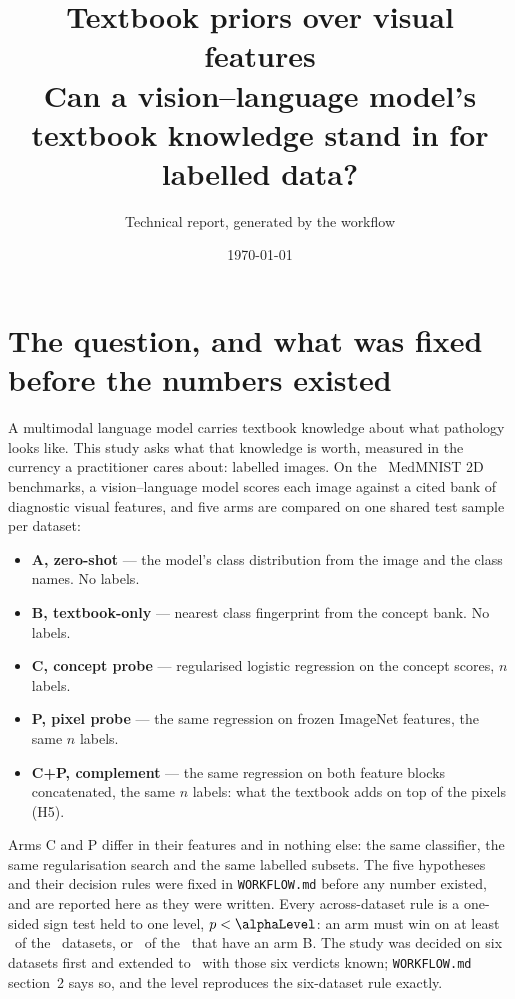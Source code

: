 \documentclass[11pt]{article}
\title{Textbook priors over visual features\\[2pt]
\large Can a vision--language model's textbook knowledge stand in for labelled data?}
\author{Technical report, generated by the workflow}
\date{\today}
\begin{document}
\maketitle

\tableofcontents
\clearpage

\section{The question, and what was fixed before the numbers existed}

A multimodal language model carries textbook knowledge about what pathology looks like. This study
asks what that knowledge is worth, measured in the currency a practitioner cares about: labelled
images. On the \numDatasets\ MedMNIST 2D benchmarks, a vision--language model scores each image
against a cited bank of diagnostic visual features, and five arms are compared on one shared test
sample per dataset:

\begin{itemize}
  \item \textbf{A, zero-shot} --- the model's class distribution from the image and the class names.
        No labels.
  \item \textbf{B, textbook-only} --- nearest class fingerprint from the concept bank. No labels.
  \item \textbf{C, concept probe} --- regularised logistic regression on the concept scores, $n$ labels.
  \item \textbf{P, pixel probe} --- the same regression on frozen ImageNet features, the same $n$ labels.
  \item \textbf{C+P, complement} --- the same regression on both feature blocks concatenated, the
        same $n$ labels: what the textbook adds on top of the pixels (H5).
\end{itemize}

Arms C and P differ in their features and in nothing else: the same classifier, the same
regularisation search and the same labelled subsets. The five hypotheses and their decision rules
were fixed in \texttt{WORKFLOW.md} before any number existed, and are reported here as they were
written. Every across-dataset rule is a one-sided sign test held to one level, $p < \alphaLevel$:
an arm must win on at least \minWinsAll\ of the \numDatasets\ datasets, or \minWinsArmB\ of the
\numArmBDatasets\ that have an arm B. The study was decided on six datasets first and extended to
\numDatasets\ with those six verdicts known; \texttt{WORKFLOW.md} section~2 says so, and the level
reproduces the six-dataset rule exactly.
\end{document}
